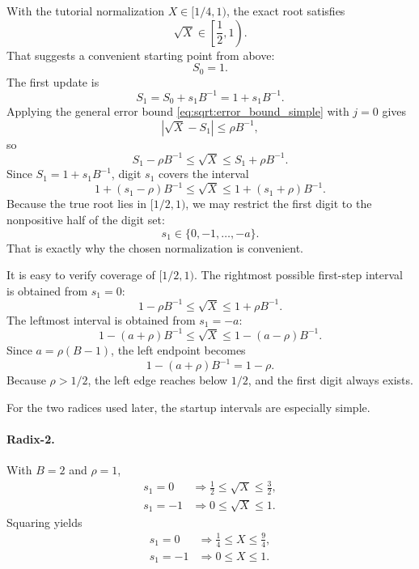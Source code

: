 \documentclass[11pt]{article}
\numberwithin{equation}{section}
\begin{document}
With the tutorial normalization $X \in [1/4,1)$, the exact root satisfies
\begin{equation}
  \label{eq:sqrt:true_root_range}
  \sqrt{X} \in \left[\frac{1}{2},1\right).
\end{equation}
That suggests a convenient starting point from above:
\begin{equation}
  \label{eq:sqrt:s0}
  S_0 = 1.
\end{equation}
The first update is
\begin{equation}
  \label{eq:sqrt:s1_def}
  S_1 = S_0 + s_1B^{-1} = 1 + s_1B^{-1}.
\end{equation}
Applying the general error bound \cref{eq:sqrt:error_bound_simple} with $j=0$ gives
\begin{equation}
  \label{eq:sqrt:init_error_bound}
  \left|\sqrt{X}-S_1\right| \le \rho B^{-1},
\end{equation}
so
\begin{equation}
  \label{eq:sqrt:init_interval}
  S_1 - \rho B^{-1} \le \sqrt{X} \le S_1 + \rho B^{-1}.
\end{equation}
Since $S_1 = 1 + s_1 B^{-1}$, digit $s_1$ covers the interval
\begin{equation}
  \label{eq:sqrt:init_interval_s1}
  1 + \left(s_1 - \rho\right)B^{-1} \le \sqrt{X} \le 1 + \left(s_1 + \rho\right)B^{-1}.
\end{equation}
Because the true root lies in $[1/2,1)$, we may restrict the first digit to the nonpositive half of
the digit set:
\[
  s_1 \in \{0,-1,\dotsc,-a\}.
\]
That is exactly why the chosen normalization is convenient.

It is easy to verify coverage of $[1/2,1)$.
The rightmost possible first-step interval is obtained from $s_1=0$:
\[
  1 - \rho B^{-1} \le \sqrt{X} \le 1 + \rho B^{-1}.
\]
The leftmost interval is obtained from $s_1=-a$:
\[
  1 - (a+\rho)B^{-1} \le \sqrt{X} \le 1 - (a-\rho)B^{-1}.
\]
Since $a = \rho(B-1)$, the left endpoint becomes
\[
  1 - (a+\rho)B^{-1} = 1 - \rho.
\]
Because $\rho > 1/2$, the left edge reaches below $1/2$, and the first digit always exists.

For the two radices used later, the startup intervals are especially simple.

\paragraph{Radix-2.}
With $B=2$ and $\rho=1$,
\begin{align*}
  s_1=0 &\Longrightarrow \frac{1}{2} \le \sqrt{X} \le \frac{3}{2}, \\
  s_1=-1 &\Longrightarrow 0 \le \sqrt{X} \le 1.
\end{align*}
Squaring yields
\begin{align*}
  s_1=0 &\Longrightarrow \frac{1}{4} \le X \le \frac{9}{4}, \\
  s_1=-1 &\Longrightarrow 0 \le X \le 1.
\end{align*}
\end{document}
